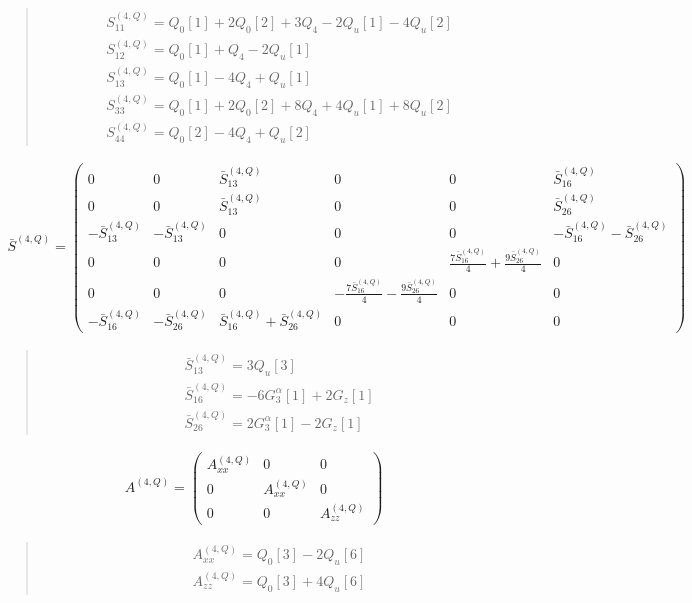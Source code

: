 \documentclass[fleqn,10pt]{jsarticle}
\begin{document}
\begin{quote}
\begin{align*}
& S^{(4,Q)}_{11} = Q_{0}[1] + 2 Q_{0}[2] + 3 Q_{4} - 2 Q_{u}[1] - 4 Q_{u}[2] \\
& S^{(4,Q)}_{12} = Q_{0}[1] + Q_{4} - 2 Q_{u}[1] \\
& S^{(4,Q)}_{13} = Q_{0}[1] - 4 Q_{4} + Q_{u}[1] \\
& S^{(4,Q)}_{33} = Q_{0}[1] + 2 Q_{0}[2] + 8 Q_{4} + 4 Q_{u}[1] + 8 Q_{u}[2] \\
& S^{(4,Q)}_{44} = Q_{0}[2] - 4 Q_{4} + Q_{u}[2]
\end{align*}
\end{quote}
\begin{align*}
\bar{S}^{(4,Q)} = \begin{pmatrix} 0 & 0 & \bar{S}^{(4,Q)}_{13} & 0 & 0 & \bar{S}^{(4,Q)}_{16} \\ 0 & 0 & \bar{S}^{(4,Q)}_{13} & 0 & 0 & \bar{S}^{(4,Q)}_{26} \\ - \bar{S}^{(4,Q)}_{13} & - \bar{S}^{(4,Q)}_{13} & 0 & 0 & 0 & - \bar{S}^{(4,Q)}_{16} - \bar{S}^{(4,Q)}_{26} \\ 0 & 0 & 0 & 0 & \frac{7 \bar{S}^{(4,Q)}_{16}}{4} + \frac{9 \bar{S}^{(4,Q)}_{26}}{4} & 0 \\ 0 & 0 & 0 & - \frac{7 \bar{S}^{(4,Q)}_{16}}{4} - \frac{9 \bar{S}^{(4,Q)}_{26}}{4} & 0 & 0 \\ - \bar{S}^{(4,Q)}_{16} & - \bar{S}^{(4,Q)}_{26} & \bar{S}^{(4,Q)}_{16} + \bar{S}^{(4,Q)}_{26} & 0 & 0 & 0 \end{pmatrix}
\end{align*}
\begin{quote}
\begin{align*}
& \bar{S}^{(4,Q)}_{13} = 3 Q_{u}[3] \\
& \bar{S}^{(4,Q)}_{16} = - 6 G_{3}^{\alpha}[1] + 2 G_{z}[1] \\
& \bar{S}^{(4,Q)}_{26} = 2 G_{3}^{\alpha}[1] - 2 G_{z}[1]
\end{align*}
\end{quote}
\begin{align*}
A^{(4,Q)} = \begin{pmatrix} A^{(4,Q)}_{xx} & 0 & 0 \\ 0 & A^{(4,Q)}_{xx} & 0 \\ 0 & 0 & A^{(4,Q)}_{zz} \end{pmatrix}
\end{align*}
\begin{quote}
\begin{align*}
& A^{(4,Q)}_{xx} = Q_{0}[3] - 2 Q_{u}[6] \\
& A^{(4,Q)}_{zz} = Q_{0}[3] + 4 Q_{u}[6]
\end{align*}
\end{quote}
\end{document}
